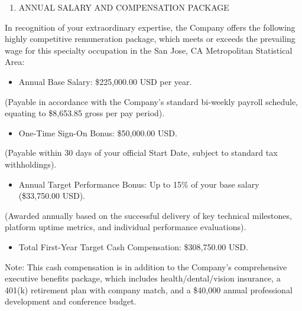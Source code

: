 \begin{enumerate}

\item ANNUAL SALARY AND COMPENSATION PACKAGE

\end{enumerate}

In recognition of your extraordinary expertise, the Company offers the following highly competitive remuneration package, which meets or exceeds the prevailing wage for this specialty occupation in the San Jose, CA Metropolitan Statistical Area:

\begin{itemize}

\item Annual Base Salary: \$225,000.00 USD per year.

\end{itemize}

(Payable in accordance with the Company’s standard bi-weekly payroll schedule, equating to \$8,653.85 gross per pay period).

\begin{itemize}

\item One-Time Sign-On Bonus: \$50,000.00 USD.

\end{itemize}

(Payable within 30 days of your official Start Date, subject to standard tax withholdings).

\begin{itemize}

\item Annual Target Performance Bonus: Up to 15\% of your base salary (\$33,750.00 USD).

\end{itemize}

(Awarded annually based on the successful delivery of key technical milestones, platform uptime metrics, and individual performance evaluations).

\begin{itemize}

\item Total First-Year Target Cash Compensation: \$308,750.00 USD.

\end{itemize}

Note: This cash compensation is in addition to the Company’s comprehensive executive benefits package, which includes health/dental/vision insurance, a 401(k) retirement plan with company match, and a \$40,000 annual professional development and conference budget.

